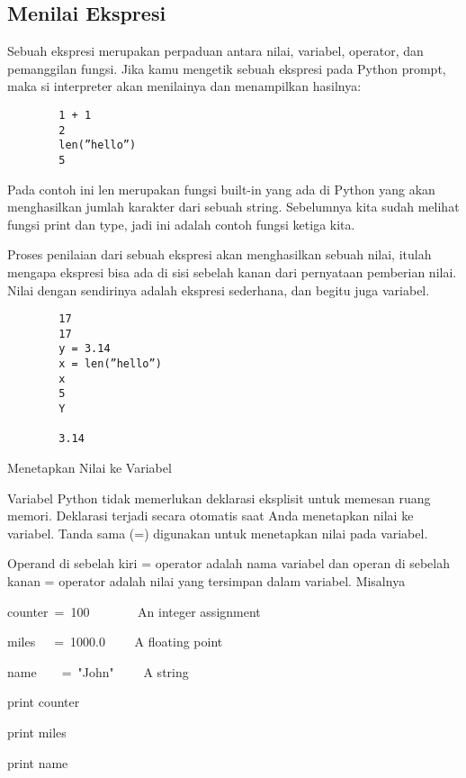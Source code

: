 \subsection{Menilai Ekspresi}
Sebuah ekspresi merupakan perpaduan antara nilai, variabel, operator, dan pemanggilan fungsi. Jika kamu mengetik sebuah ekspresi pada Python prompt, maka si interpreter akan menilainya dan menampilkan hasilnya:
	\begin{verbatim}
		1 + 1 
		2 
		len(”hello”) 
		5 
	\end{verbatim}
Pada contoh ini len merupakan fungsi built-in yang ada di Python yang akan menghasilkan jumlah karakter dari sebuah string. Sebelumnya kita sudah melihat fungsi print dan type, jadi ini adalah contoh fungsi ketiga kita.

Proses penilaian dari sebuah ekspresi akan menghasilkan sebuah nilai, itulah mengapa ekspresi bisa ada di sisi sebelah kanan dari pernyataan pemberian nilai. Nilai dengan sendirinya adalah ekspresi sederhana, dan begitu juga variabel.
	\begin{verbatim}
		17
		17 
		y = 3.14 
		x = len(”hello”) 
		x 
		5 
		Y

		3.14
	\end{verbatim}
Menetapkan Nilai ke Variabel \par
\vspace{12pt}
\noindent 
Variabel Python tidak memerlukan deklarasi eksplisit untuk memesan ruang memori. $  $Deklarasi terjadi secara otomatis saat Anda menetapkan nilai ke variabel. $  $Tanda sama (=) digunakan untuk menetapkan nilai pada variabel. \par
\vspace{12pt}
\noindent 
Operand di sebelah kiri = operator adalah nama variabel dan operan di sebelah kanan = operator adalah nilai yang tersimpan dalam variabel. $  $Misalnya  \par
\vspace{12pt}
\noindent 
counter~=~100~~~~~~~    An integer assignment \par
\noindent 
miles~~~=~1000.0~~~~    A floating point \par
\noindent 
name~~~~=~"John"~~~~    A string \par
\vspace{12pt}
\noindent 
print counter \par
\noindent 
print miles \par
\noindent 
print name \par
\vspace{12pt}
\noindent 
